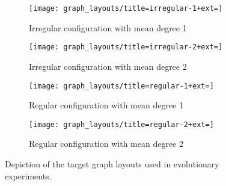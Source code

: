 \begin{figure}
\begin{minipage}{6in}
\begin{center}

\begin{subfigure}[b]{0.45\columnwidth}
\centering
\texttt{[image: graph\_layouts/title=irregular-1+ext=]}%
\caption{
Irregular configuration with mean degree 1
}
\label{fig:irregular_1}
\end{subfigure}
\begin{subfigure}[b]{0.45\columnwidth}
\centering
\texttt{[image: graph\_layouts/title=irregular-2+ext=]}%
\caption{
Irregular configuration with mean degree 2
}
\label{fig:irregular_2}
\end{subfigure}

\begin{subfigure}[b]{0.45\columnwidth}
\centering
\texttt{[image: graph\_layouts/title=regular-1+ext=]}%
\caption{
Regular configuration with mean degree 1
}
\label{fig:regular_1}
\end{subfigure}
\begin{subfigure}[b]{0.44\columnwidth}
\centering
\texttt{[image: graph\_layouts/title=regular-2+ext=]}%
\caption{
Regular configuration with mean degree 2
}
\label{fig:regular_2}
\end{subfigure}

\caption{
Depiction of the target graph layouts used in evolutionary experiments.
}
\label{fig:graph_layouts}

\end{center}
\end{minipage}
\end{figure}
